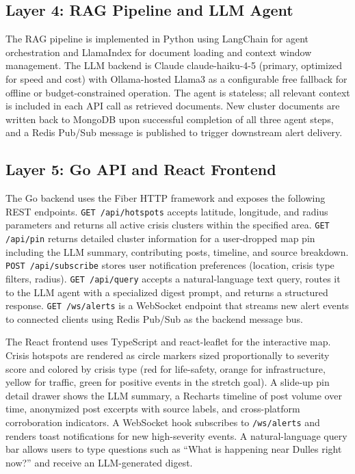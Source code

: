 \documentclass[conference]{IEEEtran}
\begin{document}
\subsection{Layer 4: RAG Pipeline and LLM Agent}

The RAG pipeline is implemented in Python using LangChain for agent
orchestration and LlamaIndex for document loading and context window
management. The LLM backend is Claude claude-haiku-4-5 (primary, optimized for
speed and cost) with Ollama-hosted Llama3 as a configurable free fallback
for offline or budget-constrained operation. The agent is stateless; all
relevant context is included in each API call as retrieved documents.
New cluster documents are written back to MongoDB upon successful completion
of all three agent steps, and a Redis Pub/Sub message is published to trigger
downstream alert delivery.

\subsection{Layer 5: Go API and React Frontend}

The Go backend uses the Fiber HTTP framework and exposes the following REST
endpoints. \texttt{GET /api/hotspots} accepts latitude, longitude, and radius
parameters and returns all active crisis clusters within the specified area.
\texttt{GET /api/pin} returns detailed cluster information for a user-dropped
map pin including the LLM summary, contributing posts, timeline, and source
breakdown. \texttt{POST /api/subscribe} stores user notification preferences
(location, crisis type filters, radius). \texttt{GET /api/query} accepts a
natural-language text query, routes it to the LLM agent with a specialized
digest prompt, and returns a structured response. \texttt{GET /ws/alerts}
is a WebSocket endpoint that streams new alert events to connected clients
using Redis Pub/Sub as the backend message bus.

The React frontend uses TypeScript and react-leaflet for the interactive map.
Crisis hotspots are rendered as circle markers sized proportionally to severity
score and colored by crisis type (red for life-safety, orange for
infrastructure, yellow for traffic, green for positive events in the stretch
goal). A slide-up pin detail drawer shows the LLM summary, a Recharts timeline
of post volume over time, anonymized post excerpts with source labels, and
cross-platform corroboration indicators. A WebSocket hook subscribes to
\texttt{/ws/alerts} and renders toast notifications for new high-severity events.
A natural-language query bar allows users to type questions such as ``What is
happening near Dulles right now?'' and receive an LLM-generated digest.
\end{document}
